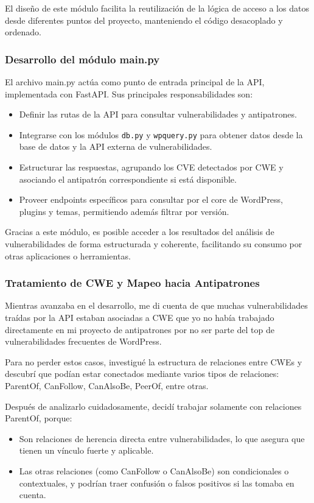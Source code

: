 El diseño de este módulo facilita la reutilización de la lógica de acceso a los datos desde diferentes puntos del proyecto, manteniendo el código desacoplado y ordenado.

\subsubsection{Desarrollo del módulo main.py}
El archivo main.py actúa como punto de entrada principal de la API, implementada con FastAPI.
Sus principales responsabilidades son:
\begin{itemize}
\item Definir las rutas de la API para consultar vulnerabilidades y antipatrones.
\item Integrarse con los módulos \texttt{db.py} y \texttt{wpquery.py} para obtener datos desde la base de datos y la API externa de vulnerabilidades.
\item Estructurar las respuestas, agrupando los CVE detectados por CWE y asociando el antipatrón correspondiente si está disponible.
\item Proveer endpoints específicos para consultar por el core de WordPress, plugins y temas, permitiendo además filtrar por versión.
\end{itemize}

Gracias a este módulo, es posible acceder a los resultados del análisis de vulnerabilidades de forma estructurada y coherente, facilitando su consumo por otras aplicaciones o herramientas.



\subsubsection{Tratamiento de CWE y Mapeo hacia Antipatrones}

Mientras avanzaba en el desarrollo, me di cuenta de que muchas vulnerabilidades traídas por la API estaban asociadas a CWE que yo no había trabajado directamente en mi proyecto de antipatrones por no ser parte del top de vulnerabilidades frecuentes de WordPress.

Para no perder estos casos, investigué la estructura de relaciones entre CWEs y descubrí que podían estar conectados mediante varios tipos de relaciones: ParentOf, CanFollow, CanAlsoBe, PeerOf, entre otras.

Después de analizarlo cuidadosamente, decidí trabajar solamente con relaciones ParentOf, porque:
\begin{itemize}
    \item Son relaciones de herencia directa entre vulnerabilidades, lo que asegura que tienen un vínculo fuerte y aplicable.
    \item Las otras relaciones (como CanFollow o CanAlsoBe) son condicionales o contextuales, y podrían traer confusión o falsos positivos si las tomaba en cuenta.
\end{itemize}


